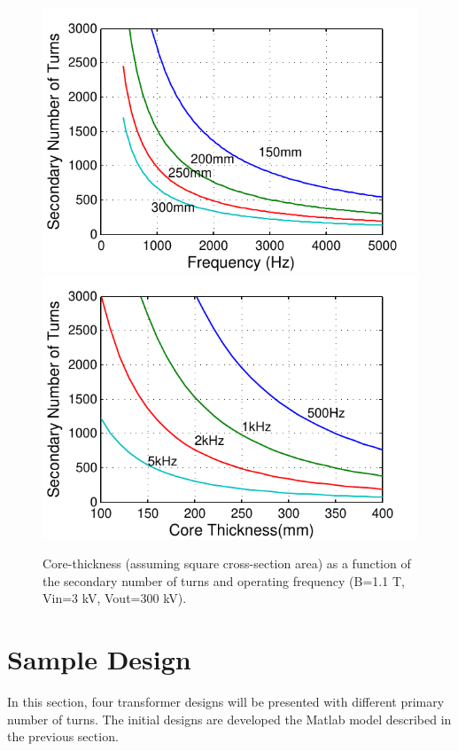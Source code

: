 \documentclass[a4paper, 11pt]{article} %
\begin{document}
\begin{figure}[]
  \centering
    \includegraphics[]{secondary_Nturns_core}
    \includegraphics[]{secondary_Nturns_freq}
   \caption{Core-thickness (assuming square cross-section area) as a function of the secondary number of turns and operating frequency (B=1.1 T, Vin=3 kV, Vout=300 kV).}
  \label{secondary_core_dimensions}
\end{figure}



\section{Sample Design}

In this section, four transformer designs will be presented with different primary number of turns. The initial designs are developed the Matlab model described in the previous section.
\end{document}
